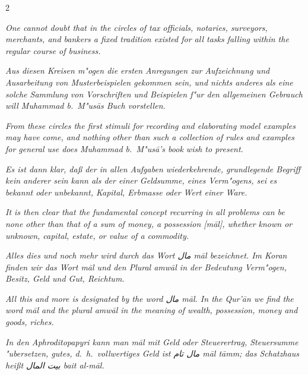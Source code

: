 \documentclass[10pt,a4paper]{article}
\newcommand{\RL}[1]{\beginR#1\endR}
\newcommand{\ar}[1]{{\arabicfont\RL{#1}}}
\begin{document}
\begin{paracol}{2}
\switchcolumn

\textit{One cannot doubt that in the circles of tax officials, notaries, surveyors, merchants, and bankers a fixed tradition existed for all tasks falling within the regular course of business.}

\switchcolumn*

\textit{Aus diesen Kreisen m"ogen die ersten Anregungen zur Aufzeichnung und Ausarbeitung von Musterbeispielen gekommen sein, und nichts anderes als eine solche Sammlung von Vorschriften und Beispielen f"ur den allgemeinen Gebrauch will Muhammad b.\ M"us\=as Buch vorstellen.}

\switchcolumn

\textit{From these circles the first stimuli for recording and elaborating model examples may have come, and nothing other than such a collection of rules and examples for general use does Muhammad b.\ M"us\=a's book wish to present.}

\switchcolumn*

\textit{Es ist dann klar, da\ss{} der in allen Aufgaben wiederkehrende, grundlegende Begriff kein anderer sein kann als der einer Geldsumme, eines Verm"ogens, sei es bekannt oder unbekannt, Kapital, Erbmasse oder Wert einer Ware.}

\switchcolumn

\textit{It is then clear that the fundamental concept recurring in all problems can be none other than that of a sum of money, a possession [\textit{m\=al}], whether known or unknown, capital, estate, or value of a commodity.}

\switchcolumn*

\textit{Alles dies und noch mehr wird durch das Wort \ar{مال} \textit{m\=al} bezeichnet. Im Koran finden wir das Wort \textit{m\=al} und den Plural \textit{amw\=al} in der Bedeutung Verm"ogen, Besitz, Geld und Gut, Reichtum.}

\switchcolumn

\textit{All this and more is designated by the word \ar{مال} \textit{m\=al}. In the Qur'\=an we find the word \textit{m\=al} and the plural \textit{amw\=al} in the meaning of wealth, possession, money and goods, riches.}

\switchcolumn*

\textit{In den Aphroditopapyri kann man \textit{m\=al} mit Geld oder Steuerertrag, Steuersumme "ubersetzen, gutes, d.\ h.\ vollwertiges Geld ist \ar{مال تام} \textit{m\=al t\=amm}; das Schatzhaus hei\ss{}t \ar{بيت المال} \textit{bait al-m\=al}.}


\end{paracol}
\end{document}
